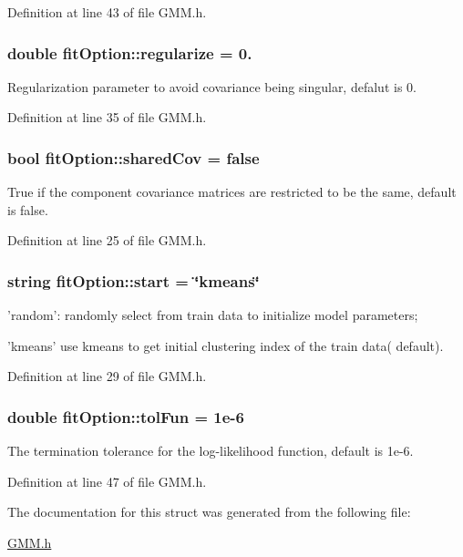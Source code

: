 Definition at line 43 of file G\+M\+M.\+h.

\hypertarget{structfit_option_abffa02537679becf07413b31f5889e6f}{
\subsubsection[{regularize}]{\setlength{\rightskip}{0pt plus 5cm}double fit\+Option\+::regularize = 0.}}\label{structfit_option_abffa02537679becf07413b31f5889e6f}
Regularization parameter to avoid covariance being singular, defalut is 0. 

Definition at line 35 of file G\+M\+M.\+h.

\hypertarget{structfit_option_a2efaf3629539e3864967853058e80420}{
\subsubsection[{shared\+Cov}]{\setlength{\rightskip}{0pt plus 5cm}bool fit\+Option\+::shared\+Cov = false}}\label{structfit_option_a2efaf3629539e3864967853058e80420}
True if the component covariance matrices are restricted to be the same, default is false. 

Definition at line 25 of file G\+M\+M.\+h.

\hypertarget{structfit_option_a4c1ecd5ba984e2e12faa29217c78f931}{
\subsubsection[{start}]{\setlength{\rightskip}{0pt plus 5cm}string fit\+Option\+::start = \char`\"{}kmeans\char`\"{}}}\label{structfit_option_a4c1ecd5ba984e2e12faa29217c78f931}
'random'\+: randomly select from train data to initialize model parameters;

'kmeans' use kmeans to get initial clustering index of the train data( default). 

Definition at line 29 of file G\+M\+M.\+h.

\hypertarget{structfit_option_a4523efadc5bc4f29cd1648ac4ca018dd}{
\subsubsection[{tol\+Fun}]{\setlength{\rightskip}{0pt plus 5cm}double fit\+Option\+::tol\+Fun = 1e-\/6}}\label{structfit_option_a4523efadc5bc4f29cd1648ac4ca018dd}
The termination tolerance for the log-\/likelihood function, default is 1e-\/6. 

Definition at line 47 of file G\+M\+M.\+h.



The documentation for this struct was generated from the following file\+:\begin{DoxyCompactItemize}
\item 
\hyperlink{_g_m_m_8h}{G\+M\+M.\+h}\end{DoxyCompactItemize}
